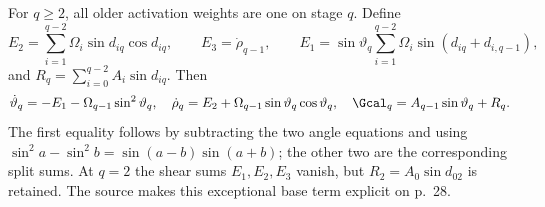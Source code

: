 For $q\ge2$, all older activation weights are one on stage $q$. Define
\[
 E_2=\sum_{i=1}^{q-2}\Omega_i\sin d_{iq}\cos d_{iq},\qquad E_3=\dot\rho_{q-1},\qquad
 E_1=\sin\vartheta_q\sum_{i=1}^{q-2}\Omega_i\sin(d_{iq}+d_{i,q-1}),
\]
and $R_q=\sum_{i=0}^{q-2}A_i\sin d_{iq}$. Then
\begin{equation}\label{cvlane:pc:eq:older}
 \dot\vartheta_q=-E_1-\Omega_{q-1}\sin^2\vartheta_q,\quad
 \dot\rho_q=E_2+\Omega_{q-1}\sin\vartheta_q\cos\vartheta_q,\quad
 \Gcal_q=A_{q-1}\sin\vartheta_q+R_q.
\end{equation}
The first equality follows by subtracting the two angle equations and using $\sin^2a-\sin^2b=\sin(a-b)\sin(a+b)$; the other two are the corresponding split sums. At $q=2$ the shear sums $E_1,E_2,E_3$ vanish, but $R_2=A_0\sin d_{02}$ is retained. The source makes this exceptional base term explicit on p.~28.


